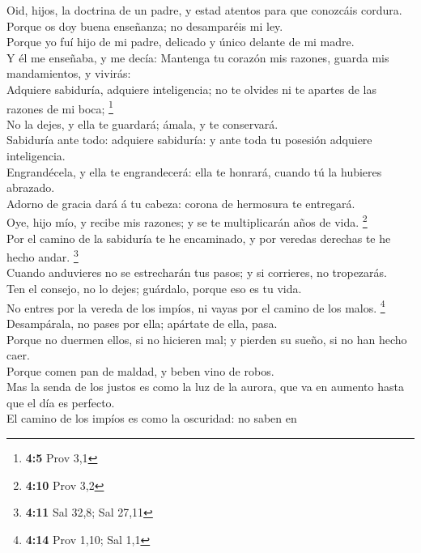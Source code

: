  Oid, hijos, la doctrina de un padre, y estad atentos para
que conozcáis cordura.\\
 Porque os doy buena enseñanza; no desamparéis mi ley.\\
 Porque yo fuí hijo de mi padre, delicado y único delante de
mi madre.\\
 Y él me enseñaba, y me decía: Mantenga tu corazón mis
razones, guarda mis mandamientos, y vivirás:\\
 Adquiere sabiduría, adquiere inteligencia; no te olvides ni
te apartes de las razones de mi boca; \footnote{\textbf{4:5} Prov 3,1}\\
 No la dejes, y ella te guardará; ámala, y te conservará.\\
 Sabiduría ante todo: adquiere sabiduría: y ante toda tu
posesión adquiere inteligencia.\\
 Engrandécela, y ella te engrandecerá: ella te honrará,
cuando tú la hubieres abrazado.\\
 Adorno de gracia dará á tu cabeza: corona de hermosura te
entregará.\\
 Oye, hijo mío, y recibe mis razones; y se te multiplicarán
años de vida. \footnote{\textbf{4:10} Prov 3,2}\\
 Por el camino de la sabiduría te he encaminado, y por
veredas derechas te he hecho andar. \footnote{\textbf{4:11} Sal 32,8;
  Sal 27,11}\\
 Cuando anduvieres no se estrecharán tus pasos; y si
corrieres, no tropezarás.\\
 Ten el consejo, no lo dejes; guárdalo, porque eso es tu
vida.\\
 No entres por la vereda de los impíos, ni vayas por el
camino de los malos. \footnote{\textbf{4:14} Prov 1,10; Sal 1,1}\\
 Desampárala, no pases por ella; apártate de ella, pasa.\\
 Porque no duermen ellos, si no hicieren mal; y pierden su
sueño, si no han hecho caer.\\
 Porque comen pan de maldad, y beben vino de robos.\\
 Mas la senda de los justos es como la luz de la aurora,
que va en aumento hasta que el día es perfecto.\\
 El camino de los impíos es como la oscuridad: no saben en
